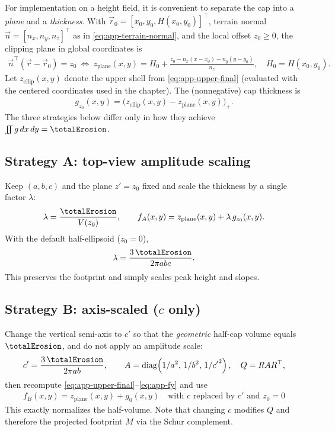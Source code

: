 For implementation on a height field, it is convenient to separate the cap into a \emph{plane} and a \emph{thickness}. With $\vec r_0=[x_0,y_0,H(x_0,y_0)]^\top$, terrain normal $\vec n=[n_x,n_y,n_z]^\top$ as in \cref{eq:app-terrain-normal}, and the local offset $z_0\ge 0$, the clipping plane in global coordinates is
\begin{align}
\label{eq:app-cap-plane}
\vec n^\top(\vec r-\vec r_0)=z_0
\ \Longleftrightarrow\
z_{\text{plane}}(x,y)=H_0+\frac{z_0-n_x(x-x_0)-n_y(y-y_0)}{n_z},\quad H_0=H(x_0,y_0).
\end{align}
Let $z_{\text{ellip}}(x,y)$ denote the upper shell from \cref{eq:app-upper-final} (evaluated with the centered coordinates used in the chapter). The (nonnegative) cap thickness is
\begin{align}
\label{eq:app-cap-thickness}
g_{z_0}(x,y)=\bigl(z_{\text{ellip}}(x,y)-z_{\text{plane}}(x,y)\bigr)_+.
\end{align}
The three strategies below differ only in how they achieve $\iint g\,dx\,dy=\totalErosion$.

\subsection*{Strategy A: top-view amplitude scaling}
Keep $(a,b,c)$ and the plane $z'=z_0$ fixed and scale the thickness by a single factor $\lambda$:
\begin{align}
\label{eq:app-stratA}
\lambda=\frac{\totalErosion}{V(z_0)},\qquad
f_A(x,y)=z_{\text{plane}}(x,y)+\lambda\,g_{z_0}(x,y).
\end{align}
With the default half-ellipsoid ($z_0=0$),
\begin{align}
\lambda=\frac{3\,\totalErosion}{2\pi a b c}.
\end{align}
This preserves the footprint and simply scales peak height and slopes.

\subsection*{Strategy B: axis-scaled ($c$ only)}
Change the vertical semi-axis to $c'$ so that the \emph{geometric} half-cap volume equals $\totalErosion$, and do not apply an amplitude scale:
\begin{align}
\label{eq:app-stratB}
c'=\frac{3\,\totalErosion}{2\pi a b},\qquad
A=\operatorname{diag}\!\left(1/a^2,\,1/b^2,\,1/{c'}^{2}\right),\quad Q=RAR^\top,
\end{align}
then recompute \cref{eq:app-upper-final}--\cref{eq:app-fy} and use
\begin{align}
f_B(x,y)=z_{\text{plane}}(x,y)+g_{0}(x,y)\quad\text{with $c$ replaced by $c'$ and $z_0=0$}
\end{align}
This exactly normalizes the half-volume. Note that changing $c$ modifies $Q$ and therefore the projected footprint $M$ via the Schur complement.

